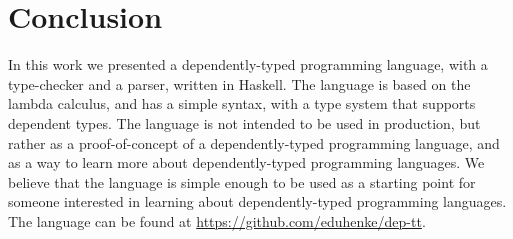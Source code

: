 \chapter{Conclusion}

In this work we presented a dependently-typed programming language, with a type-checker and a parser, written in Haskell. The language is based on the lambda calculus, and has a simple syntax, with a type system that supports dependent types. The language is not intended to be used in production, but rather as a proof-of-concept of a dependently-typed programming language, and as a way to learn more about dependently-typed programming languages. We believe that the language is simple enough to be used as a starting point for someone interested in learning about dependently-typed programming languages. The language can be found at \url{https://github.com/eduhenke/dep-tt}.

